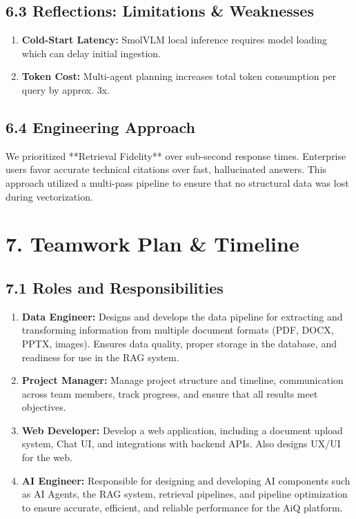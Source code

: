 \documentclass[12pt]{article}
\begin{document}
\subsection{6.3 Reflections: Limitations \& Weaknesses}
\begin{enumerate}
    \item \textbf{Cold-Start Latency:} SmolVLM local inference requires model loading which can delay initial ingestion.
    \item \textbf{Token Cost:} Multi-agent planning increases total token consumption per query by approx. 3x.
\end{enumerate}

\subsection{6.4 Engineering Approach}
We prioritized **Retrieval Fidelity** over sub-second response times. Enterprise users favor accurate technical citations over fast, hallucinated answers. This approach utilized a multi-pass pipeline to ensure that no structural data was lost during vectorization.

\newpage
\section{7. Teamwork Plan \& Timeline}

\subsection{7.1 Roles and Responsibilities}
\begin{enumerate}
    \item \textbf{Data Engineer:} Designs and develops the data pipeline for extracting and transforming information from multiple document formats (PDF, DOCX, PPTX, images). Ensures data quality, proper storage in the database, and readiness for use in the RAG system.
    \item \textbf{Project Manager:} Manage project structure and timeline, communication across team members, track progress, and ensure that all results meet objectives.
    \item \textbf{Web Developer:} Develop a web application, including a document upload system, Chat UI, and integrations with backend APIs. Also designs UX/UI for the web.
    \item \textbf{AI Engineer:} Responsible for designing and developing AI components such as AI Agents, the RAG system, retrieval pipelines, and pipeline optimization to ensure accurate, efficient, and reliable performance for the AiQ platform.
\end{enumerate}
\end{document}
